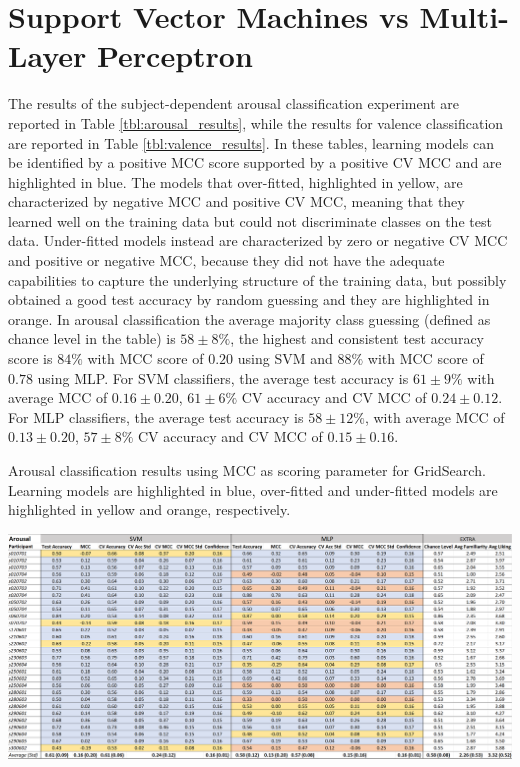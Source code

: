 \section{Support Vector Machines vs Multi-Layer Perceptron}
\label{sec:svm_mlp}
The results of the subject-dependent arousal classification experiment are reported in Table \ref{tbl:arousal_results}, while the results for valence classification are reported in Table \ref{tbl:valence_results}. In these tables, learning models can be identified by a positive \ac{MCC} score supported by a positive \ac{CV MCC} and are highlighted in blue. The models that over-fitted, highlighted in yellow, are characterized by negative \ac{MCC} and positive \ac{CV MCC}, meaning that they learned well on the training data but could not discriminate classes on the test data. Under-fitted models instead are characterized by zero or negative \ac{CV MCC} and positive or negative \ac{MCC}, because they did not have the adequate capabilities to capture the underlying structure of the training data, but possibly obtained a good test accuracy by random guessing and they are highlighted in orange.  In arousal classification the average majority class guessing (defined as chance level in the table) is \(58\pm8\%\), the highest and consistent test accuracy score is \(84\%\) with \ac{MCC} score of \(0.20\) using \ac{SVM} and \(88\%\) with \ac{MCC} score of \(0.78\) using \ac{MLP}. For \ac{SVM} classifiers, the average test accuracy is \( 61\pm9\%\) with average MCC of \(0.16\pm0.20\), \(61\pm6\% \) \ac{CV} accuracy and \ac{CV MCC} of \(0.24\pm0.12.\) For \ac{MLP} classifiers, the average test accuracy is \(58\pm12\%\), with average MCC of \(0.13\pm0.20\), \(57\pm8\% \) \ac{CV} accuracy and \ac{CV MCC} of \(0.15\pm0.16\). 

\begin{table}[h!]
  \caption{Arousal classification results using MCC as scoring parameter for GridSearch. Learning models are highlighted in blue, over-fitted and under-fitted models are highlighted in yellow and orange, respectively.}
  \label{tbl:arousal_results}
  \includegraphics[width=\linewidth]{img/results/arousal_results.png}
\end{table}

